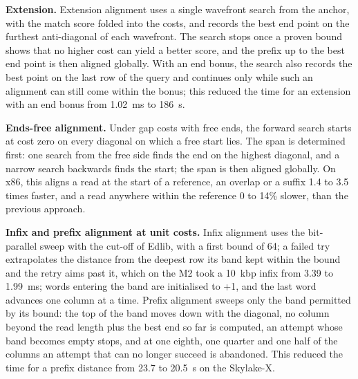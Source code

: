 \documentclass[10pt]{article}
\begin{document}
\textbf{Extension.} Extension alignment uses a single wavefront search from the anchor, with the match score folded into the costs, and records the best end point on the furthest anti-diagonal of each wavefront. The search stops once a proven bound shows that no higher cost can yield a better score, and the prefix up to the best end point is then aligned globally. With an end bonus, the search also records the best point on the last row of the query and continues only while such an alignment can still come within the bonus; this reduced the time for an extension with an end bonus from 1.02~ms to 186~\textmu s.

\textbf{Ends-free alignment.} Under gap costs with free ends, the forward search starts at cost zero on every diagonal on which a free start lies. The span is determined first: one search from the free side finds the end on the highest diagonal, and a narrow search backwards finds the start; the span is then aligned globally. On x86, this aligns a read at the start of a reference, an overlap or a suffix 1.4 to 3.5 times faster, and a read anywhere within the reference 0 to 14\% slower, than the previous approach.

\textbf{Infix and prefix alignment at unit costs.} Infix alignment uses the bit-parallel sweep with the cut-off of Edlib, with a first bound of 64; a failed try extrapolates the distance from the deepest row its band kept within the bound and the retry aims past it, which on the M2 took a 10~kbp infix from 3.39 to 1.99~ms; words entering the band are initialised to +1, and the last word advances one column at a time. Prefix alignment sweeps only the band permitted by its bound: the top of the band moves down with the diagonal, no column beyond the read length plus the best end so far is computed, an attempt whose band becomes empty stops, and at one eighth, one quarter and one half of the columns an attempt that can no longer succeed is abandoned. This reduced the time for a prefix distance from 23.7 to 20.5~\textmu s on the Skylake-X.
\end{document}
